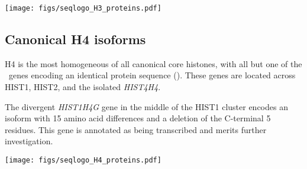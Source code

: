     \begin{table}
      \caption{%
        Canonical H3 encoded protein isoforms.
        Upper panel shows isoform variations relative to the most numerous protein isoform
        using HGVS recommended nomenclature \citep{mutnomenclature2003}.
        Lower panel shows sequence logo of all isoforms aligned
        with invariant residues in grey.
      }
      \label{tab:H3-consensus}
      
      \texttt{[image: figs/seqlogo\_H3\_proteins.pdf]}
    \end{table}

  \subsection{Canonical H4 isoforms}
    H4 is the most homogeneous of all canonical core histones,
    with all but one of the \HFourCodingGenes{}~genes encoding
    an identical protein sequence ().
    These genes are located across HIST1, HIST2, and the isolated
    \textit{HIST4H4}.

    The divergent \textit{HIST1H4G} gene in the middle of the HIST1 cluster
    encodes an isoform with 15 amino acid differences and a deletion of the C-terminal 5 residues.
    This gene is annotated as being transcribed and merits further investigation.

    \begin{table}
      \caption{%
        Canonical H4 encoded protein isoforms.
        Upper panel shows isoform variations relative to the most numerous protein isoform
        using HGVS recommended nomenclature \citep{mutnomenclature2003}.
        Lower panel shows sequence logo of all isoforms aligned
        with invariant residues in grey.
      }
      \label{tab:H4-consensus}
      
      \texttt{[image: figs/seqlogo\_H4\_proteins.pdf]}
    \end{table}
